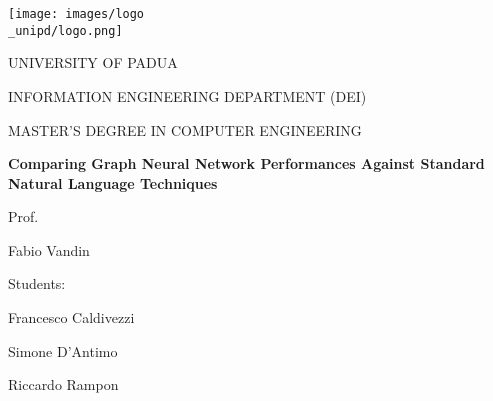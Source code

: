 \begin{titlepage}
    \begin{center}
        \texttt{[image: images/logo\\\_unipd/logo.png]}
        
        \vspace*{1cm}
        \Large
        \textmd{UNIVERSITY OF PADUA}
        
        \vspace*{1cm}
        \large
        \textmd{INFORMATION ENGINEERING DEPARTMENT (DEI)}
                
        \vspace*{0.5cm}
        \large
        \textmd{MASTER'S DEGREE IN COMPUTER ENGINEERING} 
                
        \vspace*{1cm}
        \Huge
        \textbf{Comparing Graph Neural Network Performances Against Standard Natural Language Techniques}
        
        
        \raggedright
        \vspace*{1cm}
        \large
        \textmd{Prof.}
        
        \textmd{Fabio Vandin}
        
        \raggedleft
        \vspace*{0.5cm}
        \large
        \textmd{Students:}
                
        \textmd{Francesco Caldivezzi}       
        
        \textmd{Simone D'Antimo}        
        
        \textmd{Riccardo Rampon}
        
    \end{center}
\end{titlepage}
